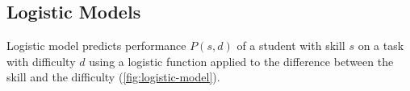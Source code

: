 %
%
%


\subsection{Logistic Models}  %
\label{sec:logistic-models}

Logistic model \cite{irt-visual-guide}  %
predicts performance $P(s, d)$
of a student with skill $s$ on a task with difficulty $d$
using a logistic function applied to the difference between the skill and the difficulty (\cref{fig:logistic-model}).

